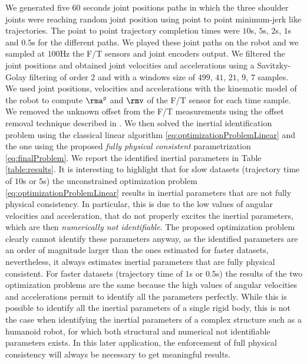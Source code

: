 We generated five 60 seconds joint positions paths in which the three shoulder joints were reaching random joint position using point to point minimum-jerk like trajectories. The point to point trajectory completion times were $10$s, $5$s, $2$s, $1$s and $0.5$s for the different paths. 
We played these joint paths on the robot and we sampled at $100$Hz the F/T sensors and joint encoders output. We filtered the joint positions and obtained joint velocities and accelerations using a Savitzky-Golay filtering of order 2 and with a windows size of $499$, $41$, $21$, $9$, $7$ samples. We used joint positions, velocities and accelerations with the kinematic model of the robot to compute $\rma^g$ and $\rmv$ of the F/T sensor for each time sample.
We removed the unknown offset from the F/T measurements using the offset removal technique described in \citep{traversaro2015situ}.
We then solved the inertial identification problem using the classical linear algorithm \eqref{eq:optimizationProblemLinear} and the one using the proposed \emph{fully physical consistent} parametrization \eqref{eq:finalProblem}.
We report the identified inertial parameters in Table \ref{table:results}. 
It is interesting to highlight that for slow datasets (trajectory time of $10$s or $5$s) the unconstrained optimization problem \eqref{eq:optimizationProblemLinear} results in inertial parameters that are not fully physical consistency. 
In particular, this is due to the low values of angular velocities and acceleration, that do not properly excites the inertial parameters, which are then \emph{numerically not identifiable}. 
The proposed optimization problem clearly cannot identify these parameters anyway, as the identified parameters are an order of magnitude larger than the ones estimated for faster datasets, nevertheless, it always estimates inertial parameters that are fully physical consistent. 
For faster datasets (trajectory time of $1$s or $0.5$s) the results of the two optimization problems are the same because the high values of angular velocities and accelerations permit to identify all the parameters perfectly. 
While this is possible to identify all the inertial parameters of a single rigid body, this is not the case when identifying the inertial parameters of a complex structure such as a humanoid robot, for which both structural \citep{ayusawa2013} and numerical \citep{pham1991essential} not identifiable parameters exists. 
In this later application, the enforcement of full physical consistency  will always be necessary to get meaningful results.



